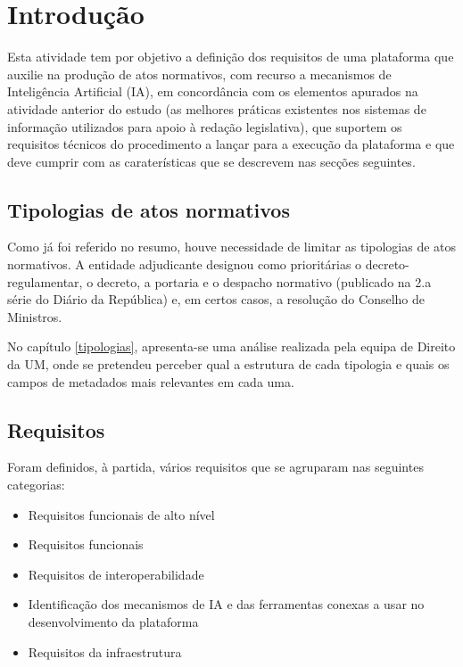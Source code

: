 \chapter{Introdução}

Esta atividade tem por objetivo a definição dos requisitos de uma plataforma
que auxilie na produção de atos normativos, com recurso a mecanismos de 
Inteligência Artificial (IA), em concordância
com os elementos apurados na atividade anterior do estudo 
(as melhores práticas existentes nos
sistemas de informação utilizados para apoio à redação legislativa), 
que suportem os requisitos técnicos do procedimento a lançar para a execução 
da plataforma e que deve cumprir com as caraterísticas que se descrevem nas secções seguintes.

\section{Tipologias de atos normativos}

Como já foi referido no resumo, houve necessidade de limitar as tipologias de atos normativos.
A entidade adjudicante designou como prioritárias o decreto-regulamentar, o decreto, a portaria e o despacho normativo 
(publicado na 2.a série do Diário da República) e, em certos casos, a resolução do Conselho de Ministros.

No capítulo \ref{tipologias}, apresenta-se uma análise realizada pela equipa de Direito da UM, onde se pretendeu perceber 
qual a estrutura de cada tipologia e quais os campos de metadados mais relevantes em cada uma.

\section{Requisitos}

Foram definidos, à partida, vários requisitos que se agruparam nas seguintes categorias:

\begin{itemize}
\item Requisitos funcionais de alto nível
\item Requisitos funcionais
\item Requisitos de interoperabilidade
\item Identificação dos mecanismos de IA e das ferramentas conexas a usar no desenvolvimento
da plataforma
\item Requisitos da infraestrutura
\end{itemize}

